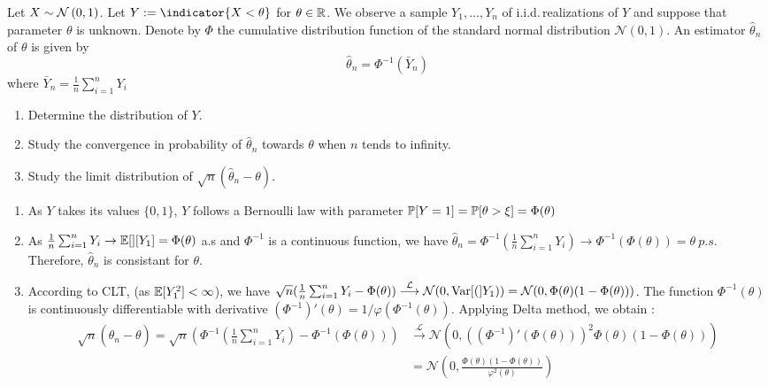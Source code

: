 
\begin{Exercise}
  Let $X \sim \mathcal{N} \left(0, 1 \right)$. Let $ Y := \indicator{X < \theta} $ for $\theta \in \mathbb{R}$. We observe a sample $Y_{1}, \ldots, Y_{n}$ of i.i.d.\,realizations of $Y$ and suppose that parameter $\theta$ is unknown.
  Denote by $\Phi$ the cumulative distribution function of the standard normal
  distribution $\mathcal{N}(0,1)$. An estimator $\hat{\theta}_{n}$ of $\theta$ is
  given by
  \[
    \hat{\theta}_{n}=\Phi^{-1}\left(\bar{Y}_{n}\right)
  \]
  where $\bar{Y}_{n}=\frac{1}{n} \sum_{i=1}^{n} Y_{i}$

  \begin{enumerate}
    \item Determine the distribution of $Y$.
    \item Study the convergence in probability of $\hat{\theta}_{n}$ towards $\theta$
          when $n$ tends to infinity.
    \item Study the limit distribution of $\sqrt{n}\left(\hat{\theta}_{n}-\theta\right)$.
  \end{enumerate}
\end{Exercise}


\begin{solution}
  \begin{enumerate}
    \item
          As $Y$ takes its values $\{0,1\}$, $Y$ follows a Bernoulli law with parameter $\mathbb{P}[Y=1] = \mathbb{P}[\theta>\xi] = \Phi(\theta)$

    \item
          As $\frac1n\sum_{i=1}^n Y_i\to\mathbb{E}[][Y_1]=\Phi(\theta)$ a.s and $\Phi^{-1}$ is a continuous function, we have $\hat \theta_n=\Phi^{-1}(\frac1n\sum_{i=1}^n Y_i)\to
            \Phi^{-1}(\Phi(\theta))=\theta~p.s$. Therefore, $\hat\theta_n$ is consistant for $\theta$.

    \item
          According to CLT, (as $\mathbb{E}[Y^2_1]<\infty$), we have $\sqrt
            n(\frac1n\sum_{i=1}^n Y_i-\Phi(\theta))\stackrel{\mathcal
              L}\longrightarrow\mathcal N(0,\operatorname{Var}[(]Y_1))=\mathcal
            N(0,\Phi(\theta)(1-\Phi(\theta)))$. The function $\Phi^{-1}(\theta)$ is
          continuously differentiable with derivative $(\Phi^{-1})'(\theta) =
            1/\varphi(\Phi^{-1}(\theta))$. Applying Delta method, we obtain :
          \begin{align*}
            \sqrt n(\hat\theta_n-\theta) =\sqrt n\left(\Phi^{-1}\left(\frac1n\sum_{i=1}^n Y_i\right)-\Phi^{-1}(\Phi(\theta))\right)
             & \stackrel{\mathcal L}\longrightarrow \mathcal N(0, {((\Phi^{-1})'(\Phi(\theta)))}^2   \Phi(\theta)(1-\Phi(\theta))) \\
             & =\mathcal N\left(0, \frac{  \Phi(\theta)(1-\Phi(\theta))}{ \varphi^2(\theta)}\right)
          \end{align*}

  \end{enumerate}
\end{solution}